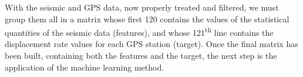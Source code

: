 \documentclass{article}
\begin{document}
With the seismic and GPS data, now properly treated and filtered, we must group them all in a matrix whose first 120 contains the values of the statistical quantities of the seismic data (features), and whose 121\textsuperscript{th} line contains the displacement rate values for each GPS station (target). Once the final matrix has been built, containing both the features and the target, the next step is the application of the machine learning method.




\end{document}
